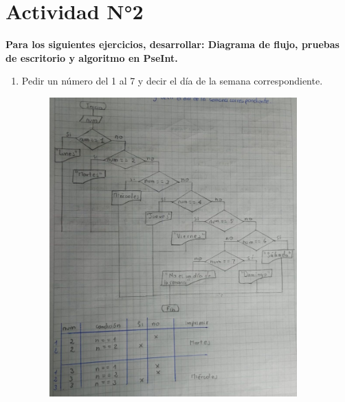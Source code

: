 \documentclass[12pt]{article}
\begin{document}
    
  
    \section*{\centering Actividad N°2}

        \textbf{Para los siguientes ejercicios, desarrollar: Diagrama de flujo, pruebas de escritorio y algoritmo en PseInt.}

        \begin{enumerate}
            \item  Pedir un número del 1 al 7 y decir el día de la semana correspondiente.
            
                \begin{figure}[!h]
                    \centering
                    \includegraphics[width=0.9\textwidth]{Img/DF_ej1.jpeg}
                \end{figure}


\end{enumerate}
\end{document}
